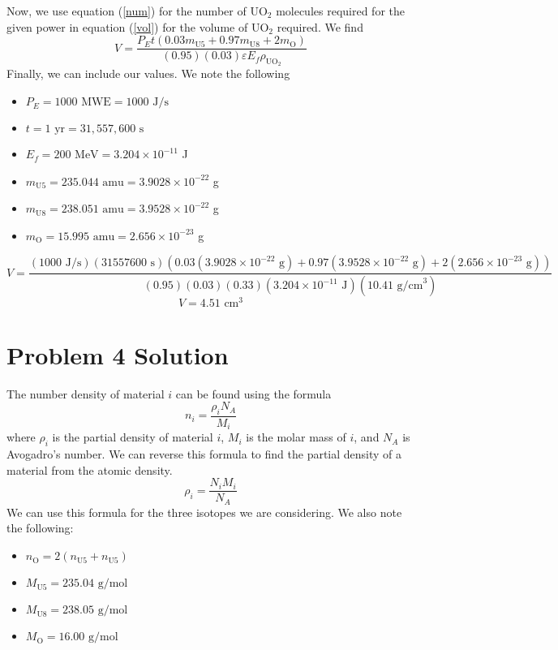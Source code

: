 \documentclass{report}
\begin{document}
Now, we use equation (\ref{num}) for the number of UO$_2$ molecules required for the given power in equation (\ref{vol}) for the volume of UO$_2$ required. We find
$$ V = \frac{P_E t(0.03m_{\text{U5}} + 0.97m_{\text{U8}} + 2 m_{\text{O}})}{(0.95)(0.03)\varepsilon E_f\rho_{\text{UO}_2}} $$
Finally, we can include our values. We note the following
\begin{itemize}
\item $P_E = 1000\text{ MWE} = 1000\text{ J/s}$
\item $t = 1\text{ yr} = 31,557,600\text{ s}$
\item $E_f = 200\text{ MeV} = 3.204 \times 10^{-11}$ J
\item $m_{\text{U5}} = 235.044\text{ amu} = 3.9028 \times 10^{-22}$ g
\item $m_{\text{U8}} = 238.051\text{ amu} = 3.9528 \times 10^{-22}$ g
\item $m_{\text{O}} = 15.995\text{ amu} = 2.656 \times 10^{-23}$ g
\end{itemize}
$$ V = \frac{(1000\text{ J/s})(31557600\text{ s})(0.03(3.9028 \times 10^{-22}\text{ g}) + 0.97(3.9528 \times 10^{-22}\text{ g}) + 2(2.656 \times 10^{-23}\text{ g}))}{(0.95)(0.03)(0.33)(3.204 \times 10^{-11}\text{ J})(10.41\text{ g/cm}^3)} $$
$$\boxed{ V = 4.51\text{ cm}^3 }$$



\newpage


\section*{Problem 4 Solution}


The number density of material $i$ can be found using the formula
$$ n_i = \frac{\rho_i N_A}{M_i} $$
where $\rho_i$ is the partial density of material $i$, $M_i$ is the molar mass of $i$, and $N_A$ is Avogadro's number. We can reverse this formula to find the partial density of a material from the atomic density.
$$ \rho_i = \frac{N_i M_i}{N_A} $$
We can use this formula for the three isotopes we are considering. We also note the following:
\begin{itemize}
\item $n_{\text{O}} = 2(n_{\text{U5}} + n_{\text{U5}})$
\item $M_{\text{U5}} = 235.04\text{ g/mol}$
\item $M_{\text{U8}} = 238.05\text{ g/mol}$
\item $M_{\text{O}} = 16.00\text{ g/mol}$
\end{itemize}
\end{document}
